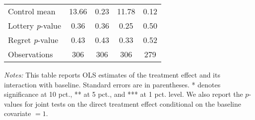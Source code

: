 \begin{table}[htbp]
{\begin{threeparttable}
\begin{tabular}{l*{4}{c}}
Control mean    &    13.66         &     0.23         &    11.78         &     0.12         \\
Lottery \emph{p}-value&     0.36         &     0.36         &     0.25         &     0.50         \\
Regret \emph{p}-value&     0.43         &     0.43         &     0.33         &     0.52         \\
Observations    &      306         &      306         &      306         &      279         \\
\bottomrule \end{tabular} \begin{tablenotes}[flushleft] \footnotesize \item \emph{Notes:} This table reports OLS estimates of the treatment effect and its interaction with baseline. Standard errors are in parentheses. * denotes significance at 10 pct., ** at 5 pct., and *** at 1 pct. level. We also report the \(p\)-values for joint tests on the direct treatment effect conditional on the baseline covariate $= 1$. \end{tablenotes} \end{threeparttable} } \end{table}
